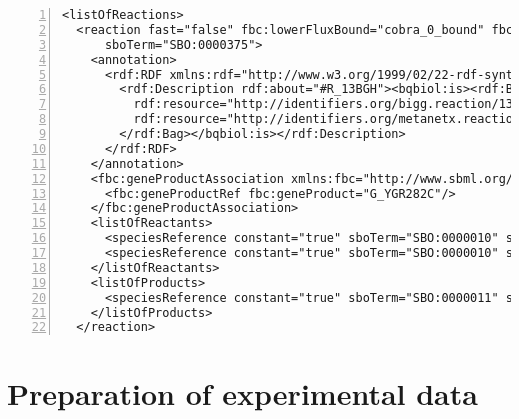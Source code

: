 \begin{lstlisting}[language=SBML,numbers=left,captionpos=t,float=t,caption={First reaction from the merged \SBML file with a layout for \iMM},label={lst:MergedSBMLlayoutPart}]
<listOfReactions>
  <reaction fast="false" fbc:lowerFluxBound="cobra_0_bound" fbc:upperFluxBound="cobra_default_ub" id="R_13BGH" metaid="R_13BGH" name="Endo 1 3 beta glucan glucohydrase" reversible="false"
      sboTerm="SBO:0000375">
    <annotation>
      <rdf:RDF xmlns:rdf="http://www.w3.org/1999/02/22-rdf-syntax-ns#" xmlns:bqbiol="http://biomodels.net/biology-qualifiers/">
        <rdf:Description rdf:about="#R_13BGH"><bqbiol:is><rdf:Bag><rdf:li
          rdf:resource="http://identifiers.org/bigg.reaction/13BGH"/><rdf:li
          rdf:resource="http://identifiers.org/metanetx.reaction/MNXR94686"/>
        </rdf:Bag></bqbiol:is></rdf:Description>
      </rdf:RDF>
    </annotation>
    <fbc:geneProductAssociation xmlns:fbc="http://www.sbml.org/sbml/level3/version1/fbc/version2">
      <fbc:geneProductRef fbc:geneProduct="G_YGR282C"/>
    </fbc:geneProductAssociation>
    <listOfReactants>
      <speciesReference constant="true" sboTerm="SBO:0000010" species="M_13BDglcn_c" stoichiometry="1"/>
      <speciesReference constant="true" sboTerm="SBO:0000010" species="M_h2o_c" stoichiometry="1"/>
    </listOfReactants>
    <listOfProducts>
      <speciesReference constant="true" sboTerm="SBO:0000011" species="M_glc__D_c" stoichiometry="1"/>
    </listOfProducts>
  </reaction>
\end{lstlisting}

\section{Preparation of experimental data}


